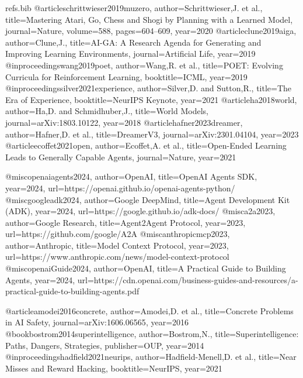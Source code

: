 \begin{filecontents*}[overwrite]{refs.bib}
@article{schrittwieser2019muzero, author={Schrittwieser,J. et al.},
  title={Mastering Atari, Go, Chess and Shogi by Planning with a Learned Model},
  journal={Nature}, volume={588}, pages={604–609}, year={2020}}
@article{clune2019aiga, author={Clune,J.},
  title={AI-GA: A Research Agenda for Generating and Improving Learning Environments},
  journal={Artificial Life}, year={2019}}
@inproceedings{wang2019poet, author={Wang,R. et al.},
  title={POET: Evolving Curricula for Reinforcement Learning},
  booktitle={ICML}, year={2019}}
@inproceedings{silver2021experience, author={Silver,D. and Sutton,R.},
  title={The Era of Experience}, booktitle={NeurIPS Keynote}, year={2021}}
@article{ha2018world, author={Ha,D. and Schmidhuber,J.},
  title={World Models}, journal={arXiv:1803.10122}, year={2018}}
@article{hafner2023dreamer, author={Hafner,D. et al.},
  title={DreamerV3}, journal={arXiv:2301.04104}, year={2023}}
@article{ecoffet2021open, author={Ecoffet,A. et al.},
  title={Open-Ended Learning Leads to Generally Capable Agents}, journal={Nature}, year={2021}}

@misc{openaiagents2024, author={OpenAI},
  title={OpenAI Agents SDK}, year={2024},
  url={https://openai.github.io/openai-agents-python/}}
@misc{googleadk2024, author={Google DeepMind},
  title={Agent Development Kit (ADK)}, year={2024},
  url={https://google.github.io/adk-docs/}}
@misc{a2a2023, author={Google Research},
  title={Agent2Agent Protocol}, year={2023}, url={https://github.com/google/A2A}}
@misc{anthropicmcp2023, author={Anthropic},
  title={Model Context Protocol}, year={2023},
  url={https://www.anthropic.com/news/model-context-protocol}}
@misc{openaiGuide2024, author={OpenAI},
  title={A Practical Guide to Building Agents}, year={2024},
  url={https://cdn.openai.com/business-guides-and-resources/a-practical-guide-to-building-agents.pdf}}

@article{amodei2016concrete, author={Amodei,D. et al.},
  title={Concrete Problems in AI Safety}, journal={arXiv:1606.06565}, year={2016}}
@book{bostrom2014superintelligence, author={Bostrom,N.},
  title={Superintelligence: Paths, Dangers, Strategies}, publisher={OUP}, year={2014}}
@inproceedings{hadfield2021neurips, author={Hadfield-Menell,D. et al.},
  title={Near Misses and Reward Hacking}, booktitle={NeurIPS}, year={2021}}


\end{filecontents*}
